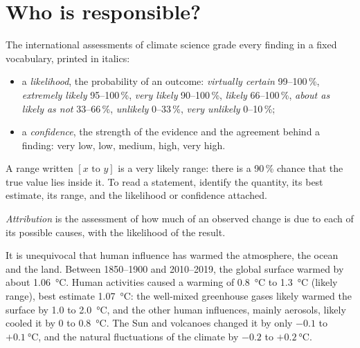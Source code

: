 \section{Who is responsible?}

\begin{method}\label{met:g12:climate-change:language}
The international assessments of climate science grade every finding in a
fixed vocabulary, printed in italics:
\begin{itemize}
  \item a \emph{likelihood}, the probability of an outcome:
        \emph{virtually certain} 99--100\,\%, \emph{extremely likely}
        95--100\,\%, \emph{very likely} 90--100\,\%, \emph{likely}
        66--100\,\%, \emph{about as likely as not} 33--66\,\%,
        \emph{unlikely} 0--33\,\%, \emph{very unlikely} 0--10\,\%;
  \item a \emph{confidence}, the strength of the evidence and the agreement
        behind a finding: very low, low, medium, high, very high.
\end{itemize}
A range written $[x \text{ to } y]$ is a very likely range: there is a 90\,\%
chance that the true value lies inside it. To read a statement, identify
the quantity, its best estimate, its range, and the likelihood or
confidence attached.
\end{method}

\begin{definition}[Attribution]\label{def:g12:climate-change:attribution}
\emph{Attribution} is the assessment of how much of an
observed change is due to each of its possible causes, with the likelihood
of the result.
\end{definition}

\begin{proposition}\label{prop:g12:climate-change:attribution}
It is unequivocal that human influence has warmed the atmosphere, the ocean
and the land. Between 1850--1900 and 2010--2019, the global surface warmed by
about \qty{1.06}{\degreeCelsius}. Human activities caused a warming of
\qty{0.8}{\degreeCelsius} to \qty{1.3}{\degreeCelsius} (likely range), best
estimate \qty{1.07}{\degreeCelsius}: the well-mixed greenhouse gases likely
warmed the surface by 1.0 to \qty{2.0}{\degreeCelsius}, and the other human
influences, mainly aerosols, likely cooled it by 0 to
\qty{0.8}{\degreeCelsius}. The Sun and volcanoes changed it by only $-0.1$
to $+\qty{0.1}{\degreeCelsius}$, and the natural fluctuations of the climate
by $-0.2$ to $+\qty{0.2}{\degreeCelsius}$.
\end{proposition}

